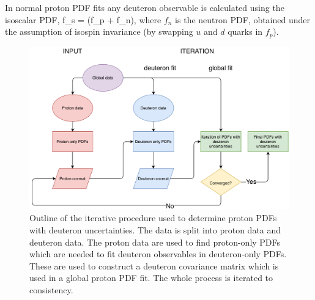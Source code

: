 In normal proton PDF fits any deuteron observable is calculated using the isoscalar PDF, 
\be
\label{eqn:iso}
f_s =  (f_p + f_n),
\ee
where $f_n$ is the neutron PDF, obtained under the assumption of isospin invariance (by swapping $u$ and $d$ quarks in $f_p$).
\begin{figure}[H]
  \begin{center}
    \includegraphics[width=\linewidth]{nuclear/plots/deut_flowchart.pdf}
   \caption{ Outline of the iterative procedure used to determine proton PDFs with deuteron uncertainties. The data is split into proton data and deuteron data. The proton data are used to find proton-only PDFs which are needed to fit deuteron observables in deuteron-only PDFs. These are used to construct a deuteron covariance matrix which is used in a global proton PDF fit. The whole process is iterated to consistency.
    \label{fig:flowchart} }
  \end{center}
\end{figure}


